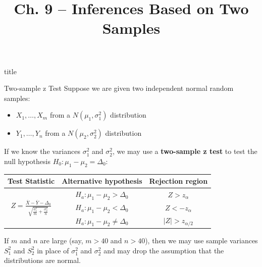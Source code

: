 \documentclass[handout]{beamer}
\title{Ch. 9 -- Inferences Based on Two Samples}
\renewcommand{\emph}{\textbf}
\begin{document}
\begin{frame}
\begin{beamercolorbox}[rounded=true,wd=\textwidth,center]{title}
\inserttitle
\end{beamercolorbox}
\end{frame} 

\begin{frame}{Two-sample z Test}
Suppose we are given two independent normal random samples:
\begin{itemize}
\item $X_1,\dots,X_m$ from a $N(\mu_1,\sigma_1^2)$ distribution
\item $Y_1,\dots,Y_n$ from a $N(\mu_2,\sigma_2^2)$ distribution
\end{itemize}
\pause If we know the variances $\sigma_1^2$ and $\sigma_2^2$, we may use a \emph{two-sample z test} to test the null hypothesis $H_0: \mu_1-\mu_2 = \Delta_0$:

\pause\begin{block}{}
\begin{tabular}{c|c|c}
Test Statistic & Alternative hypothesis & Rejection region \\ \hline
\multirow{3}{*}{$\displaystyle Z=\frac{\overline X-\overline Y-\Delta_0}{\sqrt{\frac{\sigma_1^2}m+\frac{\sigma_2^2}n}}$} & $H_a: \mu_1-\mu_2>\Delta_0$ & $Z>z_{\alpha}$ \\
& $H_a: \mu_1-\mu_2<\Delta_0$ & $Z<-z_{\alpha}$ \\
& $H_a: \mu_1-\mu_2\neq\Delta_0$ & $|Z|>z_{\alpha/2}$\\
\end{tabular}
\end{block}

\pause If $m$ and $n$ are large (say, $m>40$ and $n>40$), then we may use sample variances $S_1^2$ and $S_2^2$ in place of $\sigma_1^2$ and $\sigma_2^2$ and may drop the assumption that the distributions are normal.
\end{frame}
\end{document}
